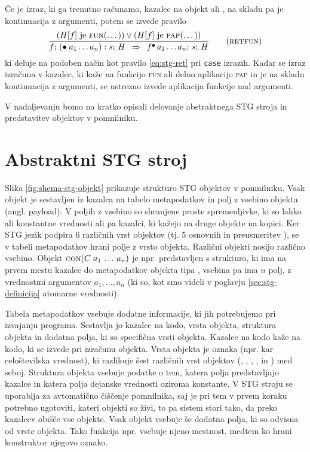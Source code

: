 Če je izraz, ki ga trenutno računamo, kazalec na objekt  ali , na skladu pa je kontinuacija z argumenti, potem se izvede pravilo
\begin{equation}
	\infer[retfun]{
		(\text{$H[f]$ je \textsc{fun}(\dots)}) \lor (\text{$H[f]$ je \textsc{pap}(\dots)})
	}{
		f; \, (\bullet \; a_1 \dots a_n) : s; \, H
	}{
		f^\bullet \, a_1 \dots a_n; \, s; \, H
	}
\label{eq:stg-retfun}
\end{equation}
ki deluje na podoben način kot pravilo \ref{eq:stg-ret} pri \texttt{case} izrazih. Kadar se izraz izračuna v kazalec, ki kaže na funkcijo \textsc{fun} ali delno aplikacijo \textsc{pap} in je na skladu kontinuacija z argumenti, se ustrezno izvede aplikacija funkcije nad argumenti.

V nadaljevanju bomo na kratko opisali delovanje abstraktnega STG stroja in predstavitev objektov v pomnilniku.

\section{Abstraktni STG stroj}
\label{sec:abstraktni-stg-stroj}

Slika \ref{fig:shema-stg-objekt} prikazuje strukturo STG objektov v pomnilniku. Vsak objekt je sestavljen iz kazalca na tabelo metapodatkov in polj z vsebino objekta (angl. payload). V poljih z vsebino so shranjene proste spremenljivke, ki so lahko ali konstantne vrednosti ali pa kazalci, ki kažejo na druge objekte na kopici. Ker STG jezik podpira 6 različnih vrst objektov (tj. 5 osnovnih in preusmeritev ), se v tabeli metapodatkov hrani polje z vrsto objekta. Različni objekti nosijo različno vsebino. Objekt $\textsc{con}(C \; a_1 \, \dots \, a_n)$ je npr. predstavljen s strukturo, ki ima na prvem mestu kazalec do metapodatkov objekta tipa , vsebina pa ima $n$ polj, z vrednostmi argumentov $a_1, \dots, a_n$ (ki so, kot smo videli v poglavju \ref{sec:stg-definicija} atomarne vrednosti). 

Tabela metapodatkov vsebuje dodatne informacije, ki jih potrebujemo pri izvajanju programa. Sestavlja jo kazalec na kodo, vrsta objekta, struktura objekta in dodatna polja, ki so specifična vrsti objekta. Kazalec na kodo kaže na kodo, ki se izvede pri izračunu objekta. Vrsta objekta je oznaka (npr. kar celoštevilska vrednost), ki razlikuje šest različnih vrst objektov (, , , ,  in ) med seboj. Struktura objekta vsebuje podatke o tem, katera polja predstavljajo kazalce in katera polja dejanske vrednosti oziroma konstante. V STG stroju se uporablja za avtomatično čiščenje pomnilnika, saj je pri tem v prvem koraku potrebno ugotoviti, kateri objekti so živi, to pa sistem stori tako, da preko kazalcev obišče vse objekte. Vsak objekt vsebuje še dodatna polja, ki so odvisna od vrste objekta. Tako funkcija  npr. vsebuje njeno mestnost, medtem ko hrani konstruktor  njegovo oznako.

